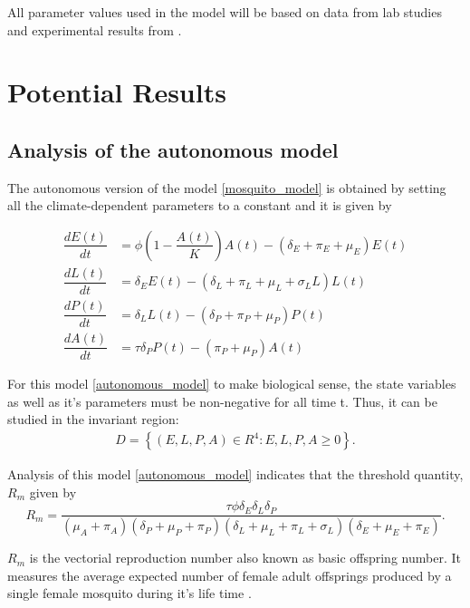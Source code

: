 \documentclass[12pt,a4paper,titlepage]{article}
\begin{document}
All parameter values used in the model will be based on data from lab studies and experimental results from \cite{bayoh2004temperature, bayoh2003effect, yang2011follow, esteva2015assessing}. 


\section{Potential Results}
\subsection{Analysis of the autonomous model}
The autonomous version of the model \ref{mosquito_model} is obtained by setting all the climate-dependent parameters to a constant and it is given by 

\begin{subequations}
	\label{autonomous_model}
	\begin{align}
		\dfrac{dE(t)}{dt} &= \phi\left(1-\dfrac{A(t)}{K}\right)A(t) - \left( \delta_E  + \pi_E+ \mu_E\right)E(t)\\
		\dfrac{dL(t)}{dt} &= \delta_EE(t) - \left( \delta_L  + \pi_L+ \mu_L + \sigma_L L\right)L(t)\\
		\dfrac{dP(t)}{dt} &= \delta_LL(t) - \left( \delta_P  + \pi_P+ \mu_P \right)P(t)\\
		\dfrac{dA(t)}{dt} &= \tau \delta_PP(t) - \left( \pi_P+ \mu_P \right)A(t)
	\end{align}
\end{subequations}

For this model \ref{autonomous_model} to make biological sense, the state variables as well as it's parameters must be non-negative for all time t. Thus, it can be studied in the invariant region: 
\begin{align}
D = \left\{ (E, L, P, A) \in R^4 : E, L, P, A \geq 0 \right\}.
\end{align}

Analysis of this model \ref{autonomous_model} indicates that the threshold quantity, $R_m$ given by 
\begin{equation}
	\label{R_m}
	R_m = \frac{\tau\phi\delta_E\delta_L\delta_P}{(\mu_A+\pi_A)(\delta_P+\mu_P+\pi_P)(\delta_L+\mu_L+\pi_L + \sigma_L)(\delta_E+\mu_E+\pi_E)}.
\end{equation}

$R_m$ is the vectorial reproduction number also known as basic offspring number. It measures the average expected number of female adult offsprings produced by a single female mosquito during it's life time \cite{abdelrazec2017mathematical, hamdan2020effect}. 
\end{document}
